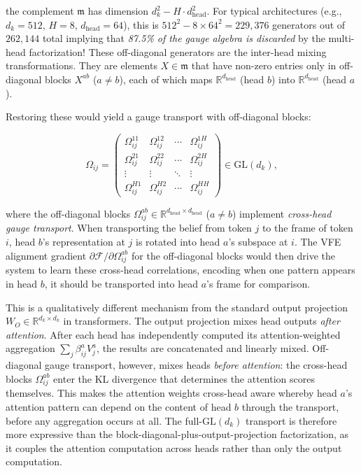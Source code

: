 \documentclass[twoside,11pt]{article}
\begin{document}
the complement $\mathfrak{m}$ has dimension $d_k^2 - H \cdot d_{\text{head}}^2$. For typical architectures (e.g., $d_k = 512$, $H = 8$, $d_{\text{head}} = 64$), this is $512^2 - 8 \times 64^2 = 229{,}376$ generators out of $262{,}144$ total implying that \emph{87.5\% of the gauge algebra is discarded} by the multi-head factorization! These off-diagonal generators are the inter-head mixing transformations. They are elements $X \in \mathfrak{m}$ that have non-zero entries only in off-diagonal blocks $X^{ab}$ ($a \neq b$), each of which maps $\mathbb{R}^{d_{\text{head}}}$ (head $b$) into $\mathbb{R}^{d_{\text{head}}}$ (head $a$).

Restoring these would yield a gauge transport with off-diagonal blocks:

\begin{equation}
\Omega_{ij} = \begin{pmatrix}
\Omega_{ij}^{11} & \Omega_{ij}^{12} & \cdots & \Omega_{ij}^{1H} \\
\Omega_{ij}^{21} & \Omega_{ij}^{22} & \cdots & \Omega_{ij}^{2H} \\
\vdots & \vdots & \ddots & \vdots \\
\Omega_{ij}^{H1} & \Omega_{ij}^{H2} & \cdots & \Omega_{ij}^{HH}
\end{pmatrix} \in \mathrm{GL}(d_k),
\label{eq:full_gauge_transport}
\end{equation}

where the off-diagonal blocks $\Omega_{ij}^{ab} \in \mathbb{R}^{d_{\text{head}} \times d_{\text{head}}}$ ($a \neq b$) implement \emph{cross-head gauge transport}. When transporting the belief from token $j$ to the frame of token $i$, head $b$'s representation at $j$ is rotated into head $a$'s subspace at $i$. The VFE alignment gradient $\partial \mathcal{F}/\partial \Omega_{ij}^{ab}$ for the off-diagonal blocks would then drive the system to learn these cross-head correlations, encoding when one pattern appears in head $b$, it should be transported into head $a$'s frame for comparison.

This is a qualitatively different mechanism from the standard output projection $W_O \in \mathbb{R}^{d_k \times d_k}$ in transformers. The output projection mixes head outputs \emph{after attention}. After each head has independently computed its attention-weighted aggregation $\sum_j \beta_{ij}^a V_j^a$, the results are concatenated and linearly mixed. Off-diagonal gauge transport, however, mixes heads \emph{before attention}: the cross-head blocks $\Omega_{ij}^{ab}$ enter the KL divergence that determines the attention scores themselves. This makes the attention weights cross-head aware whereby head $a$'s attention pattern can depend on the content of head $b$ through the transport, before any aggregation occurs at all. The full-$\mathrm{GL}(d_k)$ transport is therefore more expressive than the block-diagonal-plus-output-projection factorization, as it couples the attention computation across heads rather than only the output computation.
\end{document}
